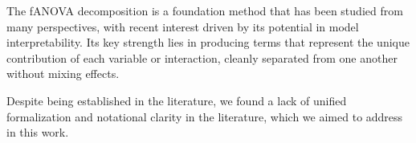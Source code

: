 






The fANOVA decomposition is a foundation method that has been studied from many perspectives, with recent interest driven by its potential in model interpretability. Its key strength lies in producing terms that represent the unique contribution of each variable or interaction, cleanly separated from one another without mixing effects.\par

Despite being established in the literature, we found a lack of unified formalization and notational clarity in the literature, which we aimed to address in this work.\par

